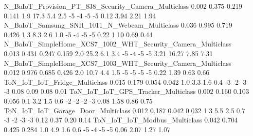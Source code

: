 N_BaIoT_Provision_PT_838_Security_Camera_Multiclass                      0.002      0.375       0.219      0.141                   1.9                  17.3                    5.4                   2.5              -5              -4               -5              -5               0.12               3.94                2.21               1.94
N_BaIoT_Samsung_SNH_1011_N_Webcam_Multiclass                             0.036      0.995       0.719      0.426                   1.3                   8.3                    2.6                   1.0              -5              -4               -5              -5               0.22               1.10                0.69               0.44
N_BaIoT_SimpleHome_XCS7_1002_WHT_Security_Camera_Multiclass              0.013      0.431       0.247      0.159                   2.0                  25.2                    6.1                   3.4              -5              -4               -5              -5               3.21              16.27                7.85               7.31
N_BaIoT_SimpleHome_XCS7_1003_WHT_Security_Camera_Multiclass              0.012      0.976       0.685      0.426                   2.0                  10.7                    4.4                   1.5              -5              -5               -5              -5               0.22               1.39                0.63               0.66
ToN_IoT_IoT_Fridge_Multiclass                                            0.015      0.179       0.054      0.042                   1.0                   3.3                    1.6                   0.4              -3              -2               -3              -3               0.08               0.09                0.08               0.01
ToN_IoT_IoT_GPS_Tracker_Multiclass                                       0.002      0.160       0.103      0.056                   0.1                   3.2                    1.5                   0.6              -2              -2               -2              -3               0.08               1.58                0.86               0.75
ToN_IoT_IoT_Garage_Door_Multiclass                                       0.012      0.187       0.042      0.032                   1.3                   5.5                    2.5                   0.7              -3              -2               -3              -3               0.12               0.37                0.20               0.14
ToN_IoT_IoT_Modbus_Multiclass                                            0.042      0.704       0.425      0.284                   1.0                   4.9                    1.6                   0.6              -5              -4               -5              -5               0.06               2.07                1.27               1.07
